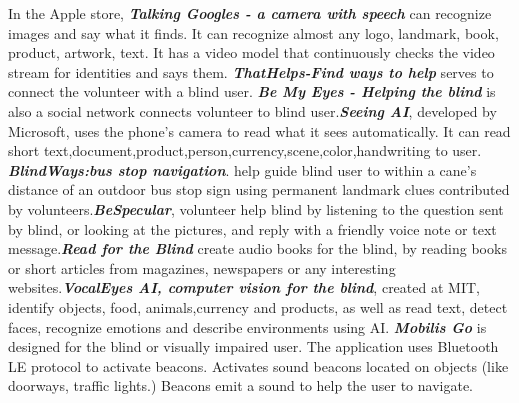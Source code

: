 \documentclass[11pt]{ucscthesis}
\begin{document}
In the Apple store,  \textbf{\textit{Talking Googles - a camera with speech}} can recognize images and say what it finds. It can recognize almost any logo, landmark, book, product, artwork, text. It has a video model that continuously checks the video stream for identities and says them. \textbf{\textit{ThatHelps-Find ways to help}} serves to connect the volunteer with a blind user. \textbf{\textit{Be My Eyes - Helping the blind}} is also a social network connects volunteer to blind user.\textbf{\textit{Seeing AI}}, developed by Microsoft, uses the phone's camera to read what it sees automatically. It can read short text,document,product,person,currency,scene,color,handwriting to user. \textbf{\textit{BlindWays:bus stop navigation}}. help guide blind user to within a cane's distance of an outdoor bus stop sign using permanent landmark clues contributed by volunteers.\textbf{\textit{BeSpecular}}, volunteer help blind by listening to the question sent by blind, or looking at the pictures, and reply with a friendly voice note or text message.\textbf{\textit{Read for the Blind}} create audio books for the blind, by reading books or short articles from magazines, newspapers or any interesting websites.\textbf{\textit{VocalEyes AI, computer vision for the blind}}, created at MIT, identify objects, food, animals,currency and products, as well as read text, detect faces, recognize emotions and describe environments using AI. 
 \textbf{\textit{Mobilis Go}} is designed for the blind or visually impaired user. The application uses Bluetooth LE protocol to activate beacons. Activates sound beacons located on objects (like doorways, traffic lights.) Beacons emit a sound to help the user to navigate.
\end{document}
